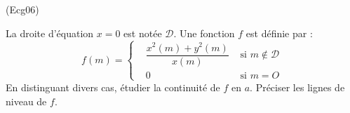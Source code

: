 \begin{tiny}(Ecg06)\end{tiny}
La droite d'équation $x=0$ est notée $\mathcal D$. Une fonction $f$ est définie par :
\begin{displaymath}
 f(m)=
\left\lbrace
\begin{aligned}
 &\dfrac{x^2(m)+y^2(m)}{x(m)} &\text{ si } m\not\in \mathcal D \\
&0 &\text{ si } m=O
\end{aligned}
\right. 
\end{displaymath}
En distinguant divers cas, étudier la continuité de $f$ en $a$. Préciser les lignes de niveau de $f$.
